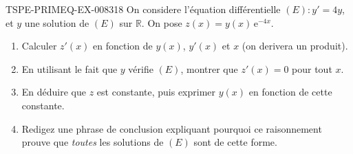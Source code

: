 \begin{exercice}{TSPE-PRIMEQ-EX-008}{3}{18}
On considere l'équation différentielle $(E) : y' = 4y$, et $y$ une solution de $(E)$ sur $\mathbb{R}$. On pose $z(x) = y(x)\,\mathrm{e}^{-4x}$.
\begin{enumerate}
  \item Calculer $z'(x)$ en fonction de $y(x)$, $y'(x)$ et $x$ (on derivera un produit).
  \item En utilisant le fait que $y$ vérifie $(E)$, montrer que $z'(x) = 0$ pour tout $x$.
  \item En déduire que $z$ est constante, puis exprimer $y(x)$ en fonction de cette constante.
  \item Redigez une phrase de conclusion expliquant pourquoi ce raisonnement prouve que \emph{toutes} les solutions de $(E)$ sont de cette forme.
\end{enumerate}
\end{exercice}
